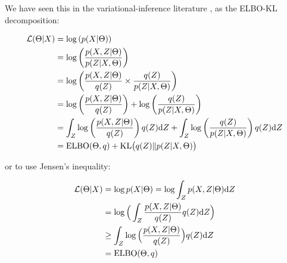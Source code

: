 \documentclass{article}
\def\L{{\cal L}}
\def\KL{\text{KL}}
\def\d{\text{d}}
\def\KL{{\text{KL}}}
\begin{document}
We have seen this in the variational-inference literature \cite{neal1998view}, as the ELBO-KL decomposition:

\begin{equation}\begin{split}
\L(\Theta|X) &= \log \left(p(X|\Theta) \right) \\
            &= \log \left( \frac{ p(X,Z|\Theta)}{ p(Z|X,\Theta) } \right) 
\\
            &= \log \left( \frac{p(X,Z|\Theta)}{q(Z)} \times \frac{ q(Z)}{p(Z|X,\Theta)} \right)\\
            &= \log \left(\frac{p(X,Z|\Theta)}{q(Z)} \right) + \log \left( \frac{q(Z)}{ p(Z|X,\Theta)} \right)\\
            &= \int_Z \log \left(\frac{p(X,Z|\Theta)}{q(Z)} \right)q(Z) \d Z + \int_Z \log \left( \frac{ q(Z)}{p(Z|X,\Theta)} \right)q(Z) \d Z\\
            &= \text{ELBO}(\Theta, q) + \KL \big( q(Z) \| p(Z|X,\Theta) \big) \\
\end{split}\end{equation}





or to use Jensen's inequality:

\begin{equation}\begin{split}
\L(\Theta|X) 
&= \log p(X|\Theta) =  \log \int_Z  p(X, Z |\Theta) \d Z \\
&=\log \Big( \int_Z \frac{  p(X,Z|\Theta)}{q(Z)} q(Z) \d Z \Big)\\
&\ge  \int_Z \log \Big( \frac{  p(X,Z|\Theta)}{q(Z)} \Big) q(Z) \d Z \\
&= \text{ELBO}(\Theta, q)
\end{split}\end{equation}
\end{document}
